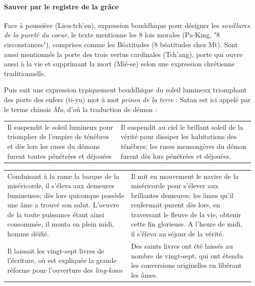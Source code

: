  \paragraph{Sauver par le registre de la grâce} Face à poussière (Lieu-tch'en), expression bouddhique pour désigner les \textit{souillures de la pureté du coeur},  le texte mentionne les 8 lois morales (Pa-King, "8 circonstances"), comprises comme les Béatitudes (8 béatitudes chez Mt).  Sont aussi mentionnés la porte des trois vertus cardinales (Tch'ang), porte qui ouvre aussi à la vie et supprimant la mort (Mié-se) selon une expression chrétienne traditionnelle. 

Puis suit une expression typiquement bouddhique du soleil lumineux triomphant des porte des enfers (ti-yu) mot à mot \textit{prison de la terre} \cite[p. 49]{Havret:stelechretienne}.  Satan est ici appelé par le terme chinois \textit{Mo}, d'où la traduction de démon :

\begin{tabular}{p{}p{}}
\\
Il suspendit le soleil lumineux pour triompher de l'empire de ténèbres et {dès lors }les ruses du démons furent toutes pénétrées et déjouées
&  Il suspendit au ciel le brillant soleil de la vérité pour dissiper les habitations des ténèbres; les ruses mensongères du démon furent dès lors pénétrées et déjouées. \\
\end{tabular}



 
 
 

\begin{tabular}{p{}p{}}
\\
Conduisant à la rame la barque de la miséricorde, il s'éleva aux demeures lumineuses; dès lors quiconque possède une âme a trouvé son salut. L'oeuvre de la toute puissance étant ainsi consommée, il monta en plein midi, homme déifié.& Il mit en mouvement le navire de la miséricorde pour s'élever aux brillantes demeures; les âmes qu'il renfermait purent dès lors, en traversant le fleuve de la vie, obtenir cette fin glorieuse. A l'heure de midi, il s'éleva au séjour de la vérité. \\ Il laissait les vingt-sept livres de l'écriture, où est expliquée la grande réforme pour l'ouverture des \textit{ling-koan}
  \cite[p. 44]{Havret:stelechretienne} & 
Des saints livres ont été laissés au nombre de vingt-sept, qui ont étendu les conversions originelles en libérant les âmes.
  \cite[p. 10]{Pauthier:linscriptionSinganfou} \\
                                                                                  
\end{tabular}
 
